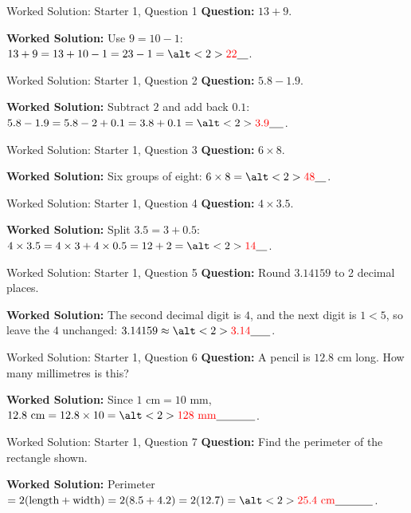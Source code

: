 \documentclass{beamer}
\newcommand{\ablank}[1]{%
  \alt<2>{\textcolor{red}{#1}}{\underline{\phantom{#1}}}%
}
\begin{document}
\begin{frame}{Worked Solution: Starter 1, Question 1}
\hypertarget{work-st1}{}
\small
\textbf{Question:} \(13+9\).

\textbf{Worked Solution:} Use \(9=10-1\):
\(13+9=13+10-1=23-1=\ablank{22}\).
\end{frame}

\begin{frame}{Worked Solution: Starter 1, Question 2}
\small
\textbf{Question:} \(5.8-1.9\).

\textbf{Worked Solution:} Subtract \(2\) and add back \(0.1\):
\(5.8-1.9=5.8-2+0.1=3.8+0.1=\ablank{3.9}\).
\end{frame}

\begin{frame}{Worked Solution: Starter 1, Question 3}
\small
\textbf{Question:} \(6\times8\).

\textbf{Worked Solution:} Six groups of eight:
\(6\times8=\ablank{48}\).
\end{frame}

\begin{frame}{Worked Solution: Starter 1, Question 4}
\small
\textbf{Question:} \(4\times3.5\).

\textbf{Worked Solution:} Split \(3.5=3+0.5\):
\(4\times3.5=4\times3+4\times0.5=12+2=\ablank{14}\).
\end{frame}

\begin{frame}{Worked Solution: Starter 1, Question 5}
\small
\textbf{Question:} Round \(3.14159\) to 2 decimal places.

\textbf{Worked Solution:} The second decimal digit is \(4\), and the next digit is \(1<5\), so leave the \(4\) unchanged:
\(3.14159\approx\ablank{3.14}\).
\end{frame}

\begin{frame}{Worked Solution: Starter 1, Question 6}
\small
\textbf{Question:} A pencil is \(12.8\) cm long. How many millimetres is this?

\textbf{Worked Solution:} Since \(1\text{ cm}=10\text{ mm}\),
\(12.8\text{ cm}=12.8\times10=\ablank{128\text{ mm}}\).
\end{frame}

\begin{frame}{Worked Solution: Starter 1, Question 7}
\small
\textbf{Question:} Find the perimeter of the rectangle shown.

\begin{center}
\end{center}

\textbf{Worked Solution:} Perimeter \(=2(\text{length}+\text{width})=2(8.5+4.2)=2(12.7)=\ablank{25.4\text{ cm}}\).
\end{frame}
\end{document}
